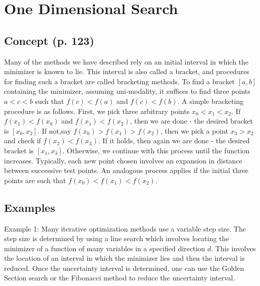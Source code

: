 \section{One Dimensional Search}

\subsection{Concept (p. 123)}
Many of the methods we have described rely on an initial interval in which the minimizer is known to lie. This interval is also called a bracket, and procedures for finding such a bracket are called bracketing methods. To find a bracket \([a, b]\) containing the minimizer, assuming uni-modality, it suffices to find three points \(a<c<b\) such that \(f(c)<f(a)\) and \(f(c)<f(b)\). A simple bracketing procedure is as follows. First, we pick three arbitrary points \(x_{0}<x_{1}<x_{2}\). If \(f\left(x_{1}\right)<f\left(x_{0}\right)\) and \(f\left(x_{1}\right)<f\left(x_{2}\right)\), then we are done - the desired bracket is \(\left[x_{0}, x_{2}\right]\). If not,say \(f\left(x_{0}\right)>f\left(x_{1}\right)>f\left(x_{2}\right)\), then we pick a point \(x_{3}>x_{2}\) and check if \(f\left(x_{2}\right)<f\left(x_{3}\right)\). If it holds, then again we are done - the desired bracket is \(\left[x_{1}, x_{3}\right]\). Otherwise, we continue with this process until the function increases. Typically, each new point chosen involves an expansion in distance between successive test points. An analogous process applies if the initial three points are such that \(f\left(x_{0}\right)<f\left(x_{1}\right)<f\left(x_{2}\right)\).


\subsection{Examples}
Example 1: Many iterative optimization methods use a variable step size. The step size is determined by using a line search which involves locating the minimizer of a function of many variables in a specified direction \(d\). This involves the location of an interval in which the minimizer lies and then the interval is reduced. Once the uncertainty interval is determined, one can use the Golden Section search or the Fibonacci method to reduce the uncertainty interval.


